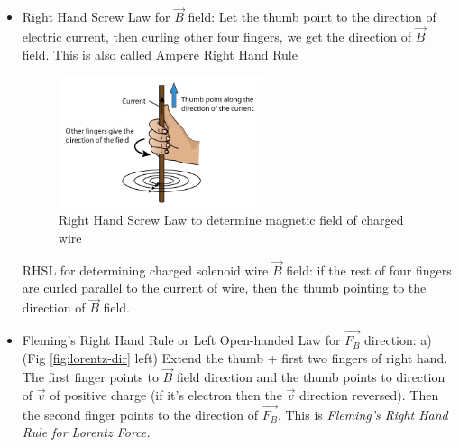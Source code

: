 \documentclass[12pt,a4paper,twoside]{article}
\numberwithin{equation}{section}
\begin{document}
    \begin{itemize}
        \item Right Hand Screw Law for $\overrightarrow{B}$ field: Let the thumb point to the direction of electric current, then curling other four fingers, we get the direction of $\overrightarrow{B}$ field. This is also called Ampere Right Hand Rule
        \begin{figure}[ht]
            \centering
            \includegraphics[width=6cm]{250-Revision/rhsl.png}
            \caption{Right Hand Screw Law to determine magnetic field of charged wire}
            \label{fig:RHSL}
        \end{figure}
        
        RHSL for determining charged solenoid wire $\overrightarrow{B}$ field: if the rest of four fingers are curled parallel to the current of wire, then the thumb pointing to the direction of $\overrightarrow{B}$ field.
        \item Fleming's Right Hand Rule or Left Open-handed Law for $\overrightarrow{F_B}$ direction:
            \subitem a) (Fig \ref{fig:lorentz-dir} left) Extend the thumb + first two fingers of right hand. The first finger points to $\overrightarrow{B}$ field direction and the thumb points to direction of $\overrightarrow{v}$ of positive charge (if it's electron then the $\overrightarrow{v}$ direction reversed). Then the second finger points to the direction of $\overrightarrow{F_B}$. This is \textit{Fleming's Right Hand Rule for Lorentz Force.}
            

\end{itemize}
\end{document}
